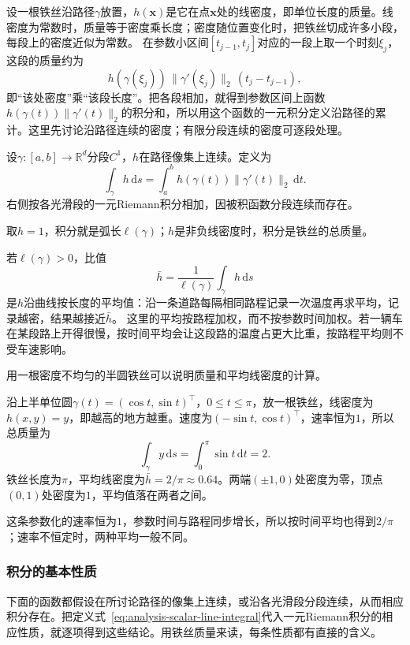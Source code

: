 设一根铁丝沿路径$\gamma$放置，$h(\bm x)$是它在点$\bm x$处的线密度，即单位长度的质量。线密度为常数时，质量等于密度乘长度；密度随位置变化时，把铁丝切成许多小段，每段上的密度近似为常数。
在参数小区间$[t_{j-1},t_j]$对应的一段上取一个时刻$\xi_j$，这段的质量约为
\[
 h(\gamma(\xi_j))\,\lVert\gamma'(\xi_j)\rVert_2\,(t_j-t_{j-1}),
\]
即“该处密度”乘“该段长度”。把各段相加，就得到参数区间上函数$h(\gamma(t))\lVert\gamma'(t)\rVert_2$的积分和，所以用这个函数的一元积分定义沿路径的累计。这里先讨论沿路径连续的密度；有限分段连续的密度可逐段处理。
\begin{definition}[第一类路径积分]
设$\gamma:[a,b]\to\mathbb R^d$分段$C^1$，$h$在路径像集上连续。定义为
\begin{equation}
 \int_\gamma h\,\mathrm ds=\int_a^b h(\gamma(t))\|\gamma'(t)\|_2\,\mathrm dt.
 \label{eq:analysis-scalar-line-integral}
\end{equation}
右侧按各光滑段的一元Riemann积分相加，因被积函数分段连续而存在。
\end{definition}

取$h=1$，积分就是弧长$\ell(\gamma)$；$h$是非负线密度时，积分是铁丝的总质量。

若$\ell(\gamma)>0$，比值
\[
 \bar h=\frac1{\ell(\gamma)}\int_\gamma h\,\mathrm ds
\]
是$h$沿曲线按长度的平均值：沿一条道路每隔相同路程记录一次温度再求平均，记录越密，结果越接近$\bar h$。
这里的平均按路程加权，而不按参数时间加权。若一辆车在某段路上开得很慢，按时间平均会让这段路的温度占更大比重，按路程平均则不受车速影响。

用一根密度不均匀的半圆铁丝可以说明质量和平均线密度的计算。
\begin{example}[上半圆铁丝的质量与平均线密度]
\label{ex:analysis-semicircle-wire}
沿上半单位圆$\gamma(t)=(\cos t,\sin t)^\top$，$0\leq t\leq\pi$，放一根铁丝，线密度为$h(x,y)=y$，即越高的地方越重。速度为$(-\sin t,\cos t)^\top$，速率恒为$1$，所以总质量为
\[
 \int_\gamma y\,\mathrm ds=\int_0^\pi\sin t\,\mathrm dt=2.
\]
铁丝长度为$\pi$，平均线密度为$\bar h=2/\pi\approx0.64$。两端$(\pm1,0)$处密度为零，顶点$(0,1)$处密度为$1$，平均值落在两者之间。
\end{example}
这条参数化的速率恒为$1$，参数时间与路程同步增长，所以按时间平均也得到$2/\pi$；速率不恒定时，两种平均一般不同。

\subsubsection{积分的基本性质}

下面的函数都假设在所讨论路径的像集上连续，或沿各光滑段分段连续，从而相应积分存在。把定义式~\eqref{eq:analysis-scalar-line-integral}代入一元Riemann积分的相应性质，就逐项得到这些结论。用铁丝质量来读，每条性质都有直接的含义。

